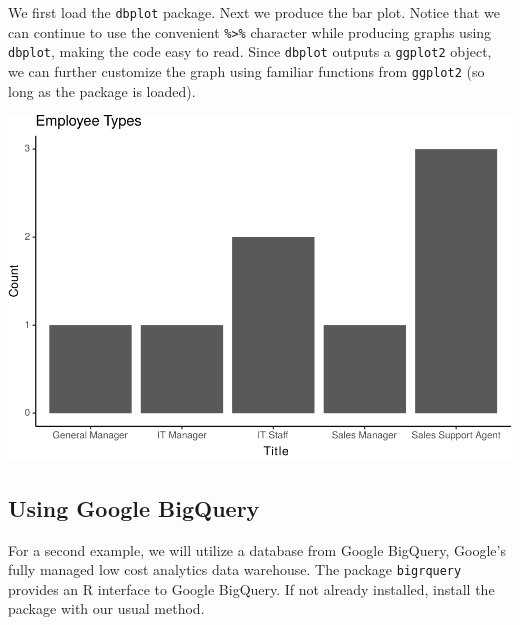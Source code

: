 \documentclass[]{krantz}
\makeatletter
\newenvironment{Shaded}{\begin{snugshade}}{\end{snugshade}}
\newcommand{\DataTypeTok}[1]{\textcolor[rgb]{0.27,0.27,0.27}{#1}}
\newcommand{\KeywordTok}[1]{\textcolor[rgb]{0.27,0.27,0.27}{\textbf{#1}}}
\newcommand{\NormalTok}[1]{#1}
\newcommand{\OperatorTok}[1]{\textcolor[rgb]{0.43,0.43,0.43}{\textbf{#1}}}
\newcommand{\StringTok}[1]{\textcolor[rgb]{0.5,0.5,0.5}{#1}}
\newenvironment{kframe}{%
\medskip{}
\setlength{\fboxsep}{.8em}
 \def\at@end@of@kframe{}%
 \ifinner\ifhmode%
  \def\at@end@of@kframe{\end{minipage}}%
  \begin{minipage}{\columnwidth}%
 \fi\fi%
 \def\FrameCommand##1{\hskip\@totalleftmargin \hskip-\fboxsep
 \colorbox{shadecolor}{##1}\hskip-\fboxsep
     \hskip-\linewidth \hskip-\@totalleftmargin \hskip\columnwidth}%
 \MakeFramed {\advance\hsize-\width
   \@totalleftmargin\z@ \linewidth\hsize
   \@setminipage}}%
 {\par\unskip\endMakeFramed%
 \at@end@of@kframe}
\renewenvironment{Shaded}{\begin{kframe}}{\end{kframe}}
\makeatother
\begin{document}
We first load the \texttt{dbplot} package. Next we produce the bar plot. Notice that we can continue to use the convenient \texttt{\%\textgreater{}\%} character while producing graphs using \texttt{dbplot}, making the code easy to read. Since \texttt{dbplot} outputs a \texttt{ggplot2} object, we can further customize the graph using familiar functions from \texttt{ggplot2} (so long as the package is loaded).

\begin{Shaded}
\end{Shaded}

\includegraphics{bookdown_files/figure-latex/unnamed-chunk-299-1.pdf}

\hypertarget{using-google-bigquery}{%
\subsection{Using Google BigQuery}\label{using-google-bigquery}}

For a second example, we will utilize a database from Google BigQuery, Google's fully managed low cost analytics data warehouse. The package \texttt{bigrquery} provides an R interface to Google BigQuery. If not already installed, install the package with our usual method.
\end{document}
